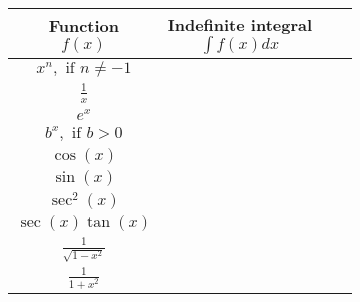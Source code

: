 \documentclass{standalone}
\begin{document}
\begin{tabular}{Sc | Sc }
  \parbox{2.5cm}{\centering\textbf{Function}\\\(f(x)\)} & \parbox{4cm}{\centering\textbf{Indefinite integral}\\\(\int f(x) dx\)} \\
  \hline\hline
  \(x^{n}, \text{ if } n \ne -1\)  & \\[2ex]
  \(\frac{1}{x}\) & \\[2ex]
  \(e^{x}\) & \\[2ex]
  \(b^{x}, \text{ if } b > 0\) &  \\[2ex]
  \(\cos(x)\) & \\[2ex]
  \(\sin(x)\) & \\[2ex]
  \(\sec^{2}(x)\) &  \\[2ex]
  \(\sec(x)\tan(x)\) & \\[2ex]
  \(\frac{1}{\sqrt{1 - x^{2}}}\) & \\[2ex]
  \(\frac{1}{1 + x^{2}}\) &
\end{tabular}
\end{document}
